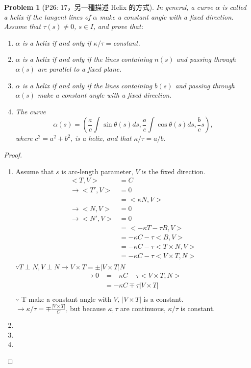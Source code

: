 \documentclass[10pt,a4paper]{article}
\newcounter{theProblemCounter}
\newtheorem{problem}[theProblemCounter]{Problem}
\begin{document}
\setcounter{theProblemCounter}{3}
\begin{problem}[P26: 17，另一種描述 Helix 的方式]
In general, a curve $\alpha$ is called a \emph{helix} if the tangent lines of $\alpha$ make a constant angle with a fixed direction. Assume that $\tau(s)\ne 0$, $s\in I$, and prove that:
\begin{enumerate}
\item[(a)] $\alpha$ is a helix if and only if $\kappa/\tau=$constant.
\item[(b)] $\alpha$ is a helix if and only if the lines containing $n(s)$ and passing through $\alpha(s)$ are parallel to a fixed plane.
\item[(c)] $\alpha$ is a helix if and only if the lines containing $b(s)$ and passing through $\alpha(s)$ make a constant angle with a fixed direction.
\item[(d)] The curve\[
\alpha(s)=\left(\frac{a}{c}\int \sin\theta(s) ds, \frac{a}{c}\int \cos\theta(s) ds, \frac{b}{c} s
\right),
\]
where $c^2=a^2+b^2$, is a helix, and that $\kappa/\tau=a/b$.
\end{enumerate}
\end{problem}
\begin{proof}
\begin{enumerate}
\item[(a)]
Assume that $s$ is arc-length parameter, $V$ is the fixed direction.\\
\begin{align*}
<T,V>&=C\\
\rightarrow <T',V>&=0\\
&=<\kappa N,V>\\
\rightarrow <N,V>&=0\\
\rightarrow <N',V>&=0\\
&=<-\kappa T-\tau B,V>\\
&=-\kappa C-\tau <B,V>\\
&=-\kappa C-\tau <T\times N,V>\\
&=-\kappa C-\tau <V\times T,N>\\
\end{align*}
$\because T\perp N, V\perp N\rightarrow V\times T=\pm\left|V\times T\right|N$\\
\begin{align*}
\rightarrow 0&=-\kappa C-\tau <V\times T,N>\\
&=-\kappa C\mp\tau\left|V\times T\right|\\
\end{align*}
$\because$ T make a constant angle with $V$, $\left|V\times T\right|$ is a constant.\\
$\rightarrow \kappa/\tau=\mp\frac{\left|V\times T\right|}{C}$, but because $\kappa, \tau$ are continuous, $\kappa/\tau$ is constant.
\item[(b)]
\item[(c)]
\item[(d)]
\end{enumerate}
\end{proof}
\end{document}
